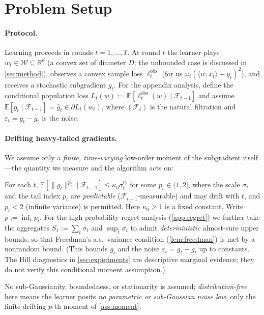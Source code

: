 \documentclass{article}
\newcommand{\E}{\mathbb{E}}
\newcommand{\R}{\mathbb{R}}
\newcommand{\ip}[2]{\langle #1, #2 \rangle}
\newcommand{\norm}[1]{\lVert #1 \rVert}
\newcommand{\gt}{g_t}
\begin{document}
\section{Problem Setup}
\label{sec:problem}

\paragraph{Protocol.} Learning proceeds in rounds $t=1,\dots,T$. At round $t$ the
learner plays $w_t\in\mathcal W\subseteq\R^d$ (a convex set of diameter $D$; the
unbounded case is discussed in \cref{sec:method}), observes a convex sample loss
$\ell_t^{\mathrm{obs}}$ (for us $\omega_t(\ip{w}{x_t}-y_t)^2$), and receives a
stochastic subgradient $\gt$. For the appendix analysis, define the conditional population
loss $L_t(w):=\E[\ell_t^{\mathrm{obs}}(w)\mid\mathcal F_{t-1}]$ and assume
$\E[\gt\mid\mathcal F_{t-1}]=\bar g_t\in\partial L_t(w_t)$, where
$(\mathcal F_t)$ is the natural filtration and $\varepsilon_t=\gt-\bar g_t$ is the noise.

\paragraph{Drifting heavy-tailed gradients.} We assume only a \emph{finite, time-varying}
low-order moment of the subgradient itself---the quantity we measure and the algorithm
acts on:
\begin{assumption}
\label{ass:moment}
For each $t$, $\E[\norm{\gt}^{p_t}\mid\mathcal F_{t-1}]\le\kappa_0\sigma_t^{p_t}$
for some $p_t\in(1,2]$, where the scale $\sigma_t$ and the tail index $p_t$ are
\emph{predictable} ($\mathcal F_{t-1}$-measurable) and may drift with $t$, and $p_t<2$
(infinite variance) is permitted. Here $\kappa_0\ge1$ is a fixed constant. Write $p:=\inf_t p_t$. For the high-probability regret
analysis (\cref{app:regret}) we further take the aggregates $S_1:=\sum_t\sigma_t$ and
$\sup_t\sigma_t$ to admit \emph{deterministic} almost-sure upper bounds, so that Freedman's
a.s.\ variance condition (\cref{lem:freedman}) is met by a nonrandom bound.
(This bounds $\bar g_t$ and the noise $\varepsilon_t=\gt-\bar g_t$ up to constants. The
Hill diagnostics in \cref{sec:experiments} are descriptive marginal evidence; they do not
verify this conditional moment assumption.)
\end{assumption}
No sub-Gaussianity, boundedness, or stationarity is assumed; \emph{distribution-free}
here means the learner posits \emph{no parametric or sub-Gaussian noise law}, only the
finite drifting $p$-th moment of \cref{ass:moment}.
\end{document}
